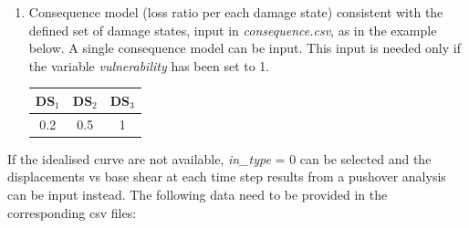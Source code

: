 \begin{enumerate}
\item Consequence model (loss ratio per each damage state) consistent with the defined set of damage states, input in \textit{consequence.csv}, as in the example below. A single consequence model can be input. This input is needed only if the variable \textit{vulnerability} has been set to 1.	
	\begin{table}[H]
	\centering
	\begin{tabular}{|c|c|c|} \hline
	\textbf{DS$_1$} & \textbf{DS$_2$} & \textbf{DS$_3$} \\ \hline
	0.2	& 0.5	 & 1\\ \hline
	\end{tabular}
	\end{table}
	
\end{enumerate}

If the idealised curve are not available, \textit{in\_type} = 0 can be selected and the displacements vs base shear at each time step results from a pushover analysis can be input instead. The following data need to be provided in the corresponding csv files:

